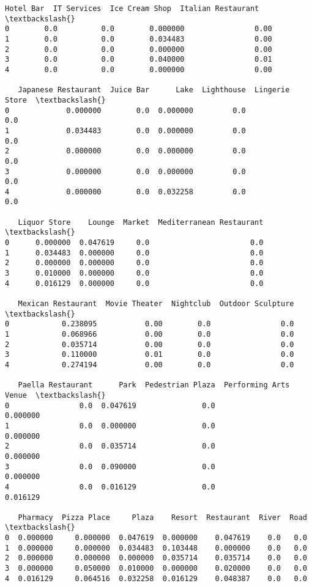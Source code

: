 \documentclass[11pt]{article}
\begin{document}
\begin{tcolorbox}[breakable, size=fbox, boxrule=.5pt, pad at break*=1mm, opacityfill=0]
\begin{Verbatim}[commandchars=\\\{\}]
   Hotel Bar  IT Services  Ice Cream Shop  Italian Restaurant  \textbackslash{}
0        0.0          0.0        0.000000                0.00
1        0.0          0.0        0.034483                0.00
2        0.0          0.0        0.000000                0.00
3        0.0          0.0        0.040000                0.01
4        0.0          0.0        0.000000                0.00

   Japanese Restaurant  Juice Bar      Lake  Lighthouse  Lingerie Store  \textbackslash{}
0             0.000000        0.0  0.000000         0.0             0.0
1             0.034483        0.0  0.000000         0.0             0.0
2             0.000000        0.0  0.000000         0.0             0.0
3             0.000000        0.0  0.000000         0.0             0.0
4             0.000000        0.0  0.032258         0.0             0.0

   Liquor Store    Lounge  Market  Mediterranean Restaurant  \textbackslash{}
0      0.000000  0.047619     0.0                       0.0
1      0.034483  0.000000     0.0                       0.0
2      0.000000  0.000000     0.0                       0.0
3      0.010000  0.000000     0.0                       0.0
4      0.016129  0.000000     0.0                       0.0

   Mexican Restaurant  Movie Theater  Nightclub  Outdoor Sculpture  \textbackslash{}
0            0.238095           0.00        0.0                0.0
1            0.068966           0.00        0.0                0.0
2            0.035714           0.00        0.0                0.0
3            0.110000           0.01        0.0                0.0
4            0.274194           0.00        0.0                0.0

   Paella Restaurant      Park  Pedestrian Plaza  Performing Arts Venue  \textbackslash{}
0                0.0  0.047619               0.0               0.000000
1                0.0  0.000000               0.0               0.000000
2                0.0  0.035714               0.0               0.000000
3                0.0  0.090000               0.0               0.000000
4                0.0  0.016129               0.0               0.016129

   Pharmacy  Pizza Place     Plaza    Resort  Restaurant  River  Road  \textbackslash{}
0  0.000000     0.000000  0.047619  0.000000    0.047619    0.0   0.0
1  0.000000     0.000000  0.034483  0.103448    0.000000    0.0   0.0
2  0.000000     0.000000  0.000000  0.035714    0.035714    0.0   0.0
3  0.000000     0.050000  0.010000  0.000000    0.020000    0.0   0.0
4  0.016129     0.064516  0.032258  0.016129    0.048387    0.0   0.0


\end{Verbatim}
\end{tcolorbox}
\end{document}
